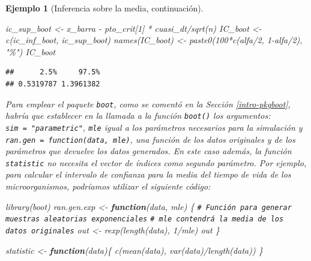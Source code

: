 \documentclass[
]{book}
\newenvironment{Shaded}{\begin{snugshade}}{\end{snugshade}}
\newcommand{\CommentTok}[1]{\textcolor[rgb]{0.56,0.35,0.01}{\textit{#1}}}
\newcommand{\ControlFlowTok}[1]{\textcolor[rgb]{0.13,0.29,0.53}{\textbf{#1}}}
\newcommand{\DecValTok}[1]{\textcolor[rgb]{0.00,0.00,0.81}{#1}}
\newcommand{\FunctionTok}[1]{\textcolor[rgb]{0.00,0.00,0.00}{#1}}
\newcommand{\NormalTok}[1]{#1}
\newcommand{\OtherTok}[1]{\textcolor[rgb]{0.56,0.35,0.01}{#1}}
\newcommand{\SpecialCharTok}[1]{\textcolor[rgb]{0.00,0.00,0.00}{#1}}
\newcommand{\StringTok}[1]{\textcolor[rgb]{0.31,0.60,0.02}{#1}}
\theoremstyle{break}
\newtheorem{example}{Ejemplo}[chapter]
\theoremstyle{nonumberplain}
\renewcommand{\CommentTok}[1]{\textcolor[rgb]{0.41,0.41,0.41}{\texttt{#1}}}
\begin{document}
\begin{example}[Inferencia sobre la media, continuación]
\begin{Shaded}
\begin{Highlighting}[]
\NormalTok{ic\_sup\_boot }\OtherTok{\textless{}{-}}\NormalTok{ x\_barra }\SpecialCharTok{{-}}\NormalTok{ pto\_crit[}\DecValTok{1}\NormalTok{] }\SpecialCharTok{*}\NormalTok{ cuasi\_dt}\SpecialCharTok{/}\FunctionTok{sqrt}\NormalTok{(n)}
\NormalTok{IC\_boot }\OtherTok{\textless{}{-}} \FunctionTok{c}\NormalTok{(ic\_inf\_boot, ic\_sup\_boot)}
\FunctionTok{names}\NormalTok{(IC\_boot) }\OtherTok{\textless{}{-}} \FunctionTok{paste0}\NormalTok{(}\DecValTok{100}\SpecialCharTok{*}\FunctionTok{c}\NormalTok{(alfa}\SpecialCharTok{/}\DecValTok{2}\NormalTok{, }\DecValTok{1}\SpecialCharTok{{-}}\NormalTok{alfa}\SpecialCharTok{/}\DecValTok{2}\NormalTok{), }\StringTok{"\%"}\NormalTok{)}
\NormalTok{IC\_boot}
\end{Highlighting}
\end{Shaded}

\begin{verbatim}
##      2.5%     97.5% 
## 0.5319787 1.3961382
\end{verbatim}

Para emplear el paquete \texttt{boot}, como se comentó en la Sección
\ref{intro-pkgboot}, habría que establecer en la llamada a la
función \texttt{boot()} los argumentos: \texttt{sim\ =\ "parametric"},
\texttt{mle} igual a los parámetros necesarios para la simulación y
\texttt{ran.gen\ =\ function(data,\ mle)}, una función de los datos originales
y de los parámetros que devuelve los datos generados.
En este caso además, la función \texttt{statistic} no necesita el vector
de índices como segundo parámetro.
Por ejemplo, para calcular el intervalo de confianza para la media del
tiempo de vida de los microorganismos, podríamos utilizar el siguiente código:

\begin{Shaded}
\begin{Highlighting}[]
\FunctionTok{library}\NormalTok{(boot)}
\NormalTok{ran.gen.exp }\OtherTok{\textless{}{-}} \ControlFlowTok{function}\NormalTok{(data, mle) \{}
    \CommentTok{\# Función para generar muestras aleatorias exponenciales}
    \CommentTok{\# mle contendrá la media de los datos originales}
\NormalTok{    out }\OtherTok{\textless{}{-}} \FunctionTok{rexp}\NormalTok{(}\FunctionTok{length}\NormalTok{(data), }\DecValTok{1}\SpecialCharTok{/}\NormalTok{mle)}
\NormalTok{    out}
\NormalTok{\}}

\NormalTok{statistic }\OtherTok{\textless{}{-}} \ControlFlowTok{function}\NormalTok{(data)\{}
    \FunctionTok{c}\NormalTok{(}\FunctionTok{mean}\NormalTok{(data), }\FunctionTok{var}\NormalTok{(data)}\SpecialCharTok{/}\FunctionTok{length}\NormalTok{(data))}
\NormalTok{\}}


\end{Highlighting}
\end{Shaded}
\end{example}
\end{document}
